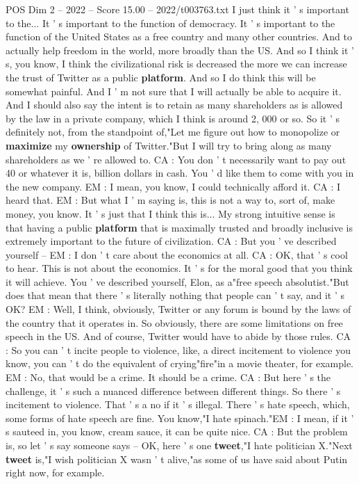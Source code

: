 \begin{textsample}{POS Dim 2 – 2022 – Score 15.00 – 2022/t003763.txt}
I just think it ' s important to the...
It ' s important to the function of democracy.
It ' s important to the function of the United States as a free country and many other countries.
And to actually help freedom in the world, more broadly than the US.
And so I think it ' s, you know, I think the civilizational risk is decreased the more we can increase the trust of Twitter as a public \textbf{platform}.
And so I do think this will be somewhat painful.
And I ' m not sure that I will actually be able to acquire it.
And I should also say the intent is to retain as many shareholders as is allowed by the law in a private company, which I think is around 2, 000 or so.
So it ' s definitely not, from the standpoint of,"Let me figure out how to monopolize or \textbf{maximize} my \textbf{ownership} of Twitter."But I will try to bring along as many shareholders as we ' re allowed to.
CA : You don ' t necessarily want to pay out 40 or whatever it is, billion dollars in cash.
You ' d like them to come with you in the new company.
EM : I mean, you know, I could technically afford it.
CA : I heard that.
EM : But what I ' m saying is, this is not a way to, sort of, make money, you know.
It ' s just that I think this is...
My strong intuitive sense is that having a public \textbf{platform} that is maximally trusted and broadly inclusive is extremely important to the future of civilization.
CA : But you ' ve described yourself -- EM : I don ' t care about the economics at all.
CA : OK, that ' s cool to hear.
This is not about the economics.
It ' s for the moral good that you think it will achieve.
You ' ve described yourself, Elon, as a"free speech absolutist."But does that mean that there ' s literally nothing that people can ' t say, and it ' s OK?
EM : Well, I think, obviously, Twitter or any forum is bound by the laws of the country that it operates in.
So obviously, there are some limitations on free speech in the US.
And of course, Twitter would have to abide by those rules.
CA : So you can ' t incite people to violence, like, a direct incitement to violence you know, you can ' t do the equivalent of crying"fire"in a movie theater, for example.
EM : No, that would be a crime.
It should be a crime.
CA : But here ' s the challenge, it ' s such a nuanced difference between different things.
So there ' s incitement to violence.
That ' s a no if it ' s illegal.
There ' s hate speech, which, some forms of hate speech are fine.
You know,"I hate spinach."EM : I mean, if it ' s sauteed in, you know, cream sauce, it can be quite nice.
CA : But the problem is, so let ' s say someone says -- OK, here ' s one \textbf{tweet},"I hate politician X."Next \textbf{tweet} is,"I wish politician X wasn ' t alive,"as some of us have said about Putin right now, for example.

\end{textsample}
